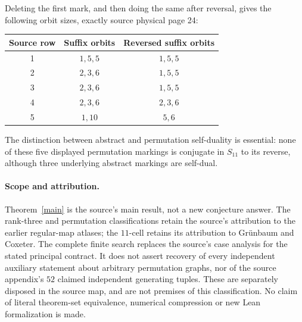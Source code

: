 \documentclass[11pt,a4paper]{article}
\begin{document}
Deleting the first mark, and then doing the same after reversal,
gives the following orbit sizes, exactly source physical page 24:
\begin{center}
\begin{tabular}{ccc}\toprule
Source row & Suffix orbits & Reversed suffix orbits\\\midrule
1 & $1,5,5$ & $1,5,5$\\
2 & $2,3,6$ & $1,5,5$\\
3 & $2,3,6$ & $1,5,5$\\
4 & $2,3,6$ & $2,3,6$\\
5 & $1,10$ & $5,6$\\\bottomrule
\end{tabular}
\end{center}
The distinction between abstract and permutation self-duality
is essential: none of these five displayed permutation markings
is conjugate in $S_{11}$ to its reverse, although three underlying
abstract markings are self-dual.

\paragraph{Scope and attribution.}
Theorem~\ref{main} is the source's main result, not a new conjecture
answer. The rank-three and permutation classifications retain
the source's attribution to the earlier regular-map atlases;
the $11$-cell retains its attribution to Gr\"unbaum and Coxeter.
The complete finite search replaces the source's case analysis
for the stated principal contract. It does not assert recovery
of every independent auxiliary statement about arbitrary
permutation graphs, nor of the source appendix's $52$ claimed
independent generating tuples. These are separately disposed
in the source map, and are not premises of this classification.
No claim of literal theorem-set equivalence, numerical compression
or new Lean formalization is made.
\end{document}

